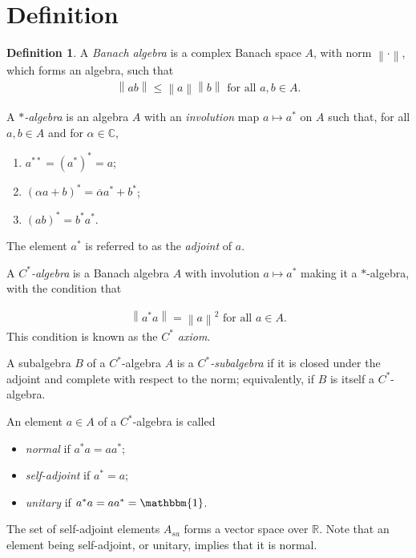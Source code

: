 \documentclass[11pt,a4paper]{report}
\theoremstyle{plain}
\theoremstyle{definition}
\newtheorem{defn}{Definition}
\newcommand{\1}{\mathbbm{1}}
\newcommand{\C}{\mathbb{C}}
\newcommand{\R}{\mathbb{R}}
\begin{document}
\section{Definition}
\begin{defn}
	A \emph{Banach algebra} is a complex Banach space $A$, with norm 
	$\left\|\cdot\right\|$, which forms an algebra, such that 
	\begin{align*}
		\left\|ab\right\| \leq 
				\left\|a\right\| \left\|b\right\| \mbox{ for all } a,b \in A.
	\end{align*}
	
	A \emph{$\ast$-algebra} is an algebra $A$ with an \emph{involution} map 
	$a \mapsto a^\ast$ on $A$ such that, for all $a,b \in A$ and for $\alpha \in \C$,
	\begin{enumerate}
		\item $a^{\ast\ast} = (a^\ast)^\ast = a$;
		\item $(\alpha a+b)^\ast = \overline{\alpha} a^\ast + b^\ast$;
		\item $(ab)^\ast = b^\ast a^\ast$.
	\end{enumerate}
	The element $a^\ast$ is referred to as the \emph{adjoint} of $a$. 
	
	A \emph{$C^\ast$-algebra} is a Banach algebra $A$ with involution $a \mapsto 
	a^\ast$ making it a $\ast$-algebra, with the condition that

	\begin{align*}
		\left\|a ^\ast a\right\| = \left\|a\right\|^2 \mbox{ for all } a \in A.
	\end{align*}
	This condition is known as the \emph{$C^\ast$ axiom}.
	
	A subalgebra $B$ of a $C^\ast$-algebra $A$ is a \emph{$C^\ast$-subalgebra} if it 
	is closed under the adjoint and complete with respect to the norm; equivalently, 
	if $B$ is itself a $C^\ast$-algebra.

	
	An element $a\in A$ of a $C^\ast$-algebra is called
	\begin{itemize}
		\item	\emph{normal} if $a^\ast a=aa^\ast$;
		\item 	\emph{self-adjoint} if $a^\ast=a$;
		\item 	\emph{unitary} if $a^\ast a = aa^\ast =\1$. 
	\end{itemize}
\end{defn}
The set of self-adjoint elements $A_{sa}$ forms a vector space over $\R$.
Note that an element being self-adjoint, or unitary, implies that it is normal.
\end{document}
